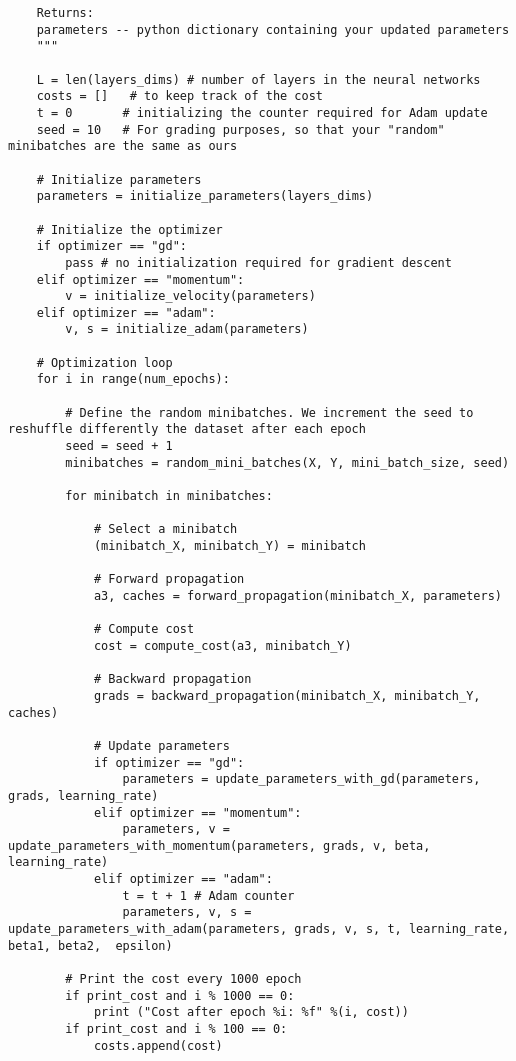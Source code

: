 {\begin{verbatim}
    Returns:
    parameters -- python dictionary containing your updated parameters 
    """

    L = len(layers_dims) # number of layers in the neural networks
    costs = []   # to keep track of the cost
    t = 0       # initializing the counter required for Adam update
    seed = 10   # For grading purposes, so that your "random" minibatches are the same as ours
    
    # Initialize parameters
    parameters = initialize_parameters(layers_dims)

    # Initialize the optimizer
    if optimizer == "gd":
        pass # no initialization required for gradient descent
    elif optimizer == "momentum":
        v = initialize_velocity(parameters)
    elif optimizer == "adam":
        v, s = initialize_adam(parameters)
    
    # Optimization loop
    for i in range(num_epochs):
        
        # Define the random minibatches. We increment the seed to reshuffle differently the dataset after each epoch
        seed = seed + 1
        minibatches = random_mini_batches(X, Y, mini_batch_size, seed)

        for minibatch in minibatches:

            # Select a minibatch
            (minibatch_X, minibatch_Y) = minibatch

            # Forward propagation
            a3, caches = forward_propagation(minibatch_X, parameters)

            # Compute cost
            cost = compute_cost(a3, minibatch_Y)

            # Backward propagation
            grads = backward_propagation(minibatch_X, minibatch_Y, caches)

            # Update parameters
            if optimizer == "gd":
                parameters = update_parameters_with_gd(parameters, grads, learning_rate)
            elif optimizer == "momentum":
                parameters, v = update_parameters_with_momentum(parameters, grads, v, beta, learning_rate)
            elif optimizer == "adam":
                t = t + 1 # Adam counter
                parameters, v, s = update_parameters_with_adam(parameters, grads, v, s, t, learning_rate, beta1, beta2,  epsilon)
        
        # Print the cost every 1000 epoch
        if print_cost and i % 1000 == 0:
            print ("Cost after epoch %i: %f" %(i, cost))
        if print_cost and i % 100 == 0:
            costs.append(cost)
                

\end{verbatim}}
